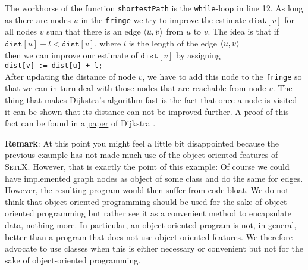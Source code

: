 The workhorse of the function \texttt{shortestPath} is the \texttt{while}-loop in line 12.  As long
as there are nodes $u$ in the \texttt{fringe} we try to improve the estimate $\mathtt{dist}[v]$ for
all nodes $v$ such that there is an edge $\pair(u,v)$ from $u$ to $v$.  The idea is that if 
\\[0.2cm]
\hspace*{1.3cm}
$\mathtt{dist}[u] + l < \mathtt{dist}[v]$, \quad where $l$ is the length of the edge $\pair(u,v)$
\\[0.2cm]
then we can improve our estimate of $\texttt{dist}[v]$ by assigning
\\[0.2cm]
\hspace*{1.3cm}
\texttt{dist[v] := dist[u] + l;}
\\[0.2cm]
After updating the distance of node $v$, we have to add this node to the \texttt{fringe} so that we
can in turn deal with those nodes that are reachable from node $v$.  The thing that makes Dijkstra's
algorithm fast is the fact that once a node is visited it can be shown that its distance can not be
improved further.  A proof of this fact can be found in a 
\href{http://www-m3.ma.tum.de/foswiki/pub/MN0506/WebHome/dijkstra.pdf}{paper} of Dijkstra \cite{dijkstra:59}.
\vspace*{0.3cm}

\noindent
\textbf{Remark}:  At this point you might feel a little bit disappointed because the previous example
has not made much use of the object-oriented features of \textsc{SetlX}.  However, that is exactly
the point of this example: Of course we could have implemented graph nodes as object of some class
and do the same for edges.  However, the resulting program would then suffer from 
\href{https://en.wikipedia.org/wiki/Code_bloat}{code bloat}.  We do
not think that object-oriented programming should be used for the sake of object-oriented
programming but rather see it as a convenient method to encapsulate data, nothing more.  In
particular, an object-oriented program is not, in general, better than a program that does not use
object-oriented features.  We therefore advocate to use classes when this is either necessary or 
convenient but not for the sake of object-oriented programming.

